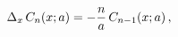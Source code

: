 \[\Delta_{x}\mathop{C_{n}\/}\nolimits\!\left(x;a\right)=-\frac{n}{a}\mathop{C_{n%
-1}\/}\nolimits\!\left(x;a\right),\]